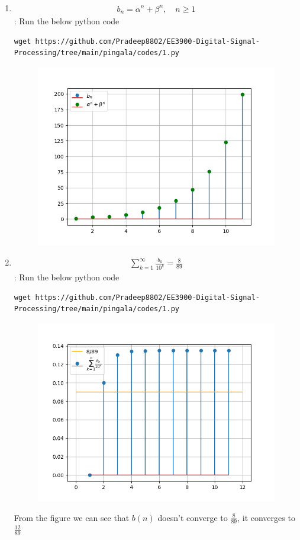 \documentclass[journal,12pt,twocolumn]{IEEEtran}
\renewcommand\thesection{\arabic{section}}
\begin{document}
\begin{enumerate}[label=\thesection.\arabic*
,ref=\thesection.\theenumi]
\begin{figure}[h]
	\caption{}
\end{figure}
\item 
\begin{align}
	b_n =\alpha^n + \beta^n, \quad n \ge 1
\end{align}
\solution:
Run the below python code 
\begin{lstlisting}
wget https://github.com/Pradeep8802/EE3900-Digital-Signal-Processing/tree/main/pingala/codes/1.py
\end{lstlisting}
\begin{figure}[h]
	\centering
	\includegraphics[width=0.7\columnwidth]{./figs/1.3.png}
	\caption{}
\end{figure}
\item 
\begin{align}
	\sum_{k=1}^{\infty}\frac{b_k}{10^k} =\frac{8}{89}
\end{align}
\solution:
Run the below python code 
\begin{lstlisting}
wget https://github.com/Pradeep8802/EE3900-Digital-Signal-Processing/tree/main/pingala/codes/1.py
\end{lstlisting}
\begin{figure}[h]
	\centering
	\includegraphics[width=0.7\columnwidth]{./figs/1.4.png}
	\caption{}
\end{figure}
From the figure we can see that $b(n)$ doesn't converge to $\frac{8}{89}$, it converges to $\frac{12}{89}$
\end{enumerate}
\end{document}
